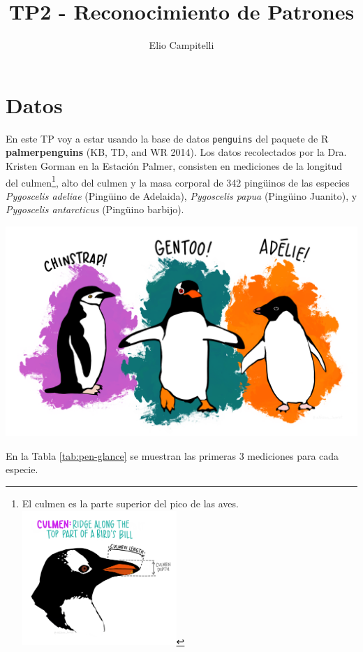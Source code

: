 \documentclass[]{tufte-handout}
\title{TP2 - Reconocimiento de Patrones}
\author{Elio Campitelli}
\date{}
\begin{document}
\maketitle




\hypertarget{datos}{%
\section{Datos}\label{datos}}

En este TP voy a estar usando la base de datos \texttt{penguins} del paquete de R \textbf{palmerpenguins} (KB, TD, and WR 2014). Los datos recolectados por la Dra. Kristen Gorman en la Estación Palmer, consisten en mediciones de la longitud del culmen\footnote{El culmen es la parte superior del pico de las aves.
  \includegraphics[width=2.3in]{culmen_depth} }, alto del culmen y la masa corporal de 342 pingüinos de las especies \emph{Pygoscelis adeliae} (Pingüino de Adelaida), \emph{Pygoscelis papua} (Pingüino Juanito), y \emph{Pygoscelis antarcticus} (Pingüino barbijo).

\begin{center}\includegraphics[width=0.8\linewidth]{penguins} \end{center}

En la Tabla \ref{tab:pen-glance} se muestran las primeras 3 mediciones para cada especie.
\end{document}
